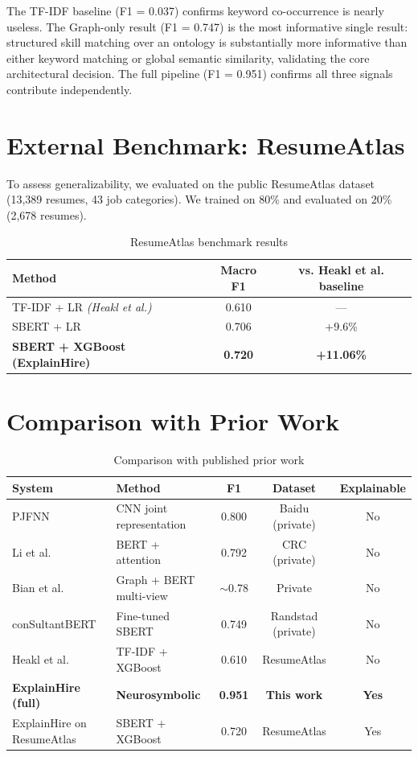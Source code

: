 \documentclass[12pt,a4paper]{report}
\begin{document}
The TF-IDF baseline (F1 = 0.037) confirms keyword co-occurrence is nearly useless. The Graph-only result (F1 = 0.747) is the most informative single result: structured skill matching over an ontology is substantially more informative than either keyword matching or global semantic similarity, validating the core architectural decision. The full pipeline (F1 = 0.951) confirms all three signals contribute independently.

\section{External Benchmark: ResumeAtlas}

To assess generalizability, we evaluated on the public ResumeAtlas dataset (13,389 resumes, 43 job categories). We trained on 80\% and evaluated on 20\% (2,678 resumes).

\begin{table}[h]
\centering
\caption{ResumeAtlas benchmark results}
\label{tab:benchmark}
\begin{tabular}{lcc}
\toprule
\textbf{Method} & \textbf{Macro F1} & \textbf{vs. Heakl et al. baseline} \\
\midrule
TF-IDF + LR \textit{(Heakl et al.)} & 0.610 & --- \\
SBERT + LR & 0.706 & +9.6\% \\
\textbf{SBERT + XGBoost (ExplainHire)} & \textbf{0.720} & \textbf{+11.06\%} \\
\bottomrule
\end{tabular}
\end{table}

\section{Comparison with Prior Work}

\begin{table}[h]
\centering
\caption{Comparison with published prior work}
\label{tab:priorwork}
\begin{tabular}{llccc}
\toprule
\textbf{System} & \textbf{Method} & \textbf{F1} & \textbf{Dataset} & \textbf{Explainable} \\
\midrule
PJFNN \cite{zhu2018} & CNN joint representation & 0.800 & Baidu (private) & No \\
Li et al. \cite{li2020} & BERT + attention & 0.792 & CRC (private) & No \\
Bian et al. \cite{bian2020} & Graph + BERT multi-view & $\sim$0.78 & Private & No \\
conSultantBERT \cite{lavi2021} & Fine-tuned SBERT & 0.749 & Randstad (private) & No \\
Heakl et al. \cite{heakl2024} & TF-IDF + XGBoost & 0.610 & ResumeAtlas & No \\
\midrule
\textbf{ExplainHire (full)} & \textbf{Neurosymbolic} & \textbf{0.951} & \textbf{This work} & \textbf{Yes} \\
ExplainHire on ResumeAtlas & SBERT + XGBoost & 0.720 & ResumeAtlas & Yes \\
\bottomrule
\end{tabular}
\end{table}
\end{document}
